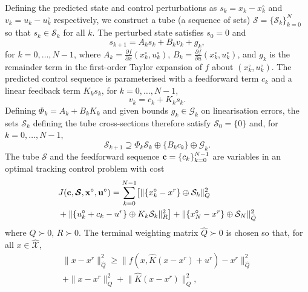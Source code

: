 \documentclass[a4paper, 10 pt, conference]{IEEEconf}
\def\G{\mathcal{G}}
\def\S{\mathcal{S}}
\def\V{\mathcal{V}}
\def\X{\mathcal{X}}
\def\bc{{\bf c}}
\def\bS{\boldsymbol{\mathcal{S}}}
\begin{document}
Defining the predicted state and control perturbations as $s_k = x_k - x^\circ_k$ and $v_k = {u_k-u^\circ_k}$ respectively, we construct a tube (a sequence of sets) $\bS = \{\S_k\}_{k=0}^N$ so that $s_k\in\S_k$ for all $k$.
%
The perturbed state satisfies $s_0=0$ and
%
\[
s_{k+1} = A_k s_k + B_k v_k  + g_k, 
\]
for $k= 0, \ldots, N-1$, where $A_k = \frac{\partial f}{\partial x}(x_k^\circ, u_k^\circ)$, $B_k = \frac{\partial f}{\partial u}(x_k^\circ, u_k^\circ)$, and $g_k$ is the remainder term in the first-order Taylor expansion of $f$ about $(x_k^\circ,u_k^\circ)$. 
%
The predicted control sequence is parameterised with a feedforward term $c_k$ and a linear feedback term $K_k s_k$, for $ k = 0,\ldots, N-1$,
\begin{equation}
\label{eq:input}
v_k = c_k + K_k s_k.
\end{equation}
Defining $\Phi_k = A_k +  B_k K_k$ and given bounds $g_k\in\G_k$ on linearisation errors, the sets $\S_k$ defining the tube cross-sections therefore satisfy $\S_0=\{0\}$ and, for $k= 0, \ldots, {N-1}$,
\begin{equation}\label{eq:tube0}
\S_{k+1} \supseteq \Phi_k \S_k \oplus \{ B_k   c_k\} \oplus \G_k.
\end{equation}
The tube $\bS$ and the feedforward sequence $\bc=\{c_k\}_{k=0}^{N-1}$ are variables in an optimal tracking control problem with cost
\begin{align}
& J(\bc,\bS,{\bf x}^\circ,{\bf u}^\circ) =  \sum_{k = 0}^{N-1}\bigl[\lVert \{x_k^\circ - x^r\}\oplus \S_k \rVert_Q^2  
\nonumber \\
&+ \lVert \{u_k^\circ + c_k- u^r\} \oplus K_k\S_k \rVert_R^2\bigr]
+ \lVert \{x_N^\circ - x^r\} \oplus \S_N \rVert_{\hat{Q}}^2
\label{eq:cost}
\end{align}
where $Q \succ 0$, $R \succ 0$. The terminal weighting matrix $\hat{Q} \succ 0$ is chosen so that, for all $x\in\hat{\X}$, 
\begin{multline}\label{eq:Q_N}
\lVert x-x^r\rVert_{\hat{Q}}^2 \geq 
\lVert f(x,\hat{K}(x - x^r)+u^r) - x^r\rVert_{\hat{Q}}^2 
\\
+ \lVert x - x^r \rVert_Q^2
+ \lVert \hat{K}( x - x^r) \rVert_Q^2 ,
\end{multline}
\end{document}
